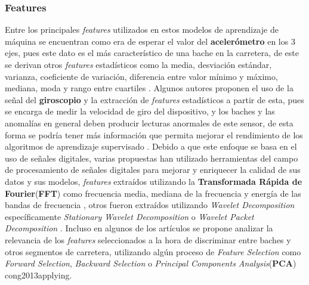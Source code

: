 		\subsubsection{Features}
			Entre los principales \emph{features} utilizados en estos modelos de aprendizaje de máquina se encuentran como era de esperar el valor 
			del \textbf{acelerómetro} en los 3 ejes, pues este dato es el más característico de una bache en la carretera, de este se derivan otros
			\emph{features} estadísticos como la media, desviación estándar, varianza, coeficiente de variación, diferencia entre valor mínimo y
			máximo, mediana, moda y rango entre cuartiles . Algunos autores proponen el uso de la señal del \textbf{giroscopio} y la extracción de \emph{features} estadísticos
			a partir de esta, pues se encarga de medir la velocidad de giro del dispositivo, y los baches y las anomalías en general deben producir
			lecturas anormales de este sensor, de esta forma se podría tener más información que permita mejorar el rendimiento de los algoritmos 
			de aprendizaje supervisado . Debido a que este enfoque se basa en el uso de señales digitales,
			varias propuestas han utilizado herramientas del campo de procesamiento de señales digitales para mejorar y enriquecer la calidad de sus 
			datos y sus modelos, \emph{features} extraídos utilizando la \textbf{Transformada Rápida de Fourier}(\textbf{FFT}) como frecuencia media,
			mediana de la frecuencia y energía de las bandas de frecuencia , otros fueron extraídos
			utilizando \emph{Wavelet Decomposition} específicamente \emph{Stationary Wavelet Decomposition}  o \emph{Wavelet
			Packet Decomposition} . Incluso en algunos de los artículos se propone analizar la relevancia de los \emph
			{features} seleccionados a la hora de discriminar entre baches y otros segmentos de carretera, utilizando algún proceso de \emph{Feature
			Selection} como \emph{Forward Selection}, \emph{Backward Selection} o \emph{Principal Components Analysis}(\textbf{PCA}) \brackcite
			{cong2013applying}.

